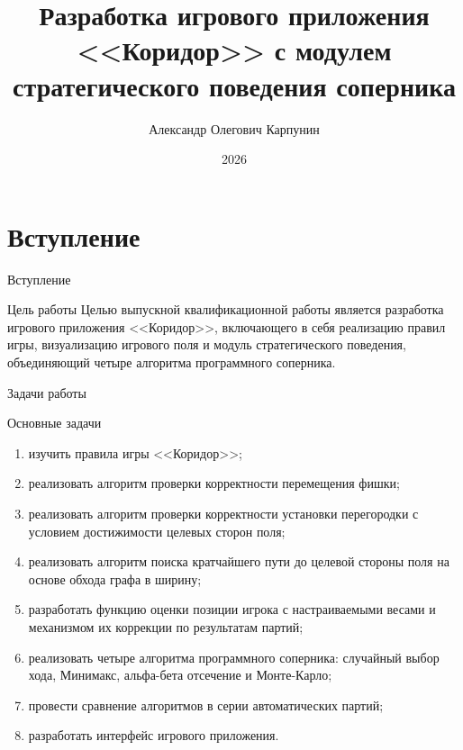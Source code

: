 \documentclass[fullscreen=true,russian,compress,%
    hyperref={unicode,bookmarks=false}]{presentation}
\begin{document}
\title[Игровое приложение <<Коридор>>]{Разработка игрового приложения\\ <<Коридор>> с модулем стратегического поведения соперника}
\author{Александр Олегович Карпунин}
\date{2026}

\begin{frame}
\titlepage
\end{frame}

\section{Вступление}

\begin{frame}{Вступление}
\begin{block}{Цель работы}
Целью выпускной квалификационной работы является разработка игрового приложения <<Коридор>>, включающего в себя реализацию правил игры, визуализацию игрового поля и модуль стратегического поведения, объединяющий четыре алгоритма программного соперника.
\end{block}

\end{frame}

\begin{frame}{Задачи работы}
\begin{block}{Основные задачи}
\small
\begin{enumerate}
    \item изучить правила игры <<Коридор>>;
    \item реализовать алгоритм проверки корректности перемещения фишки;
    \item реализовать алгоритм проверки корректности установки перегородки с условием достижимости целевых сторон поля;
    \item реализовать алгоритм поиска кратчайшего пути до целевой стороны поля на основе обхода графа в ширину;
    \item разработать функцию оценки позиции игрока с настраиваемыми весами и механизмом их коррекции по результатам партий;
    \item реализовать четыре алгоритма программного соперника: случайный выбор хода, Минимакс, альфа-бета отсечение и Монте-Карло;
    \item провести сравнение алгоритмов в серии автоматических партий;
    \item разработать интерфейс игрового приложения.
\end{enumerate}
\end{block}
\end{frame}
\end{document}
